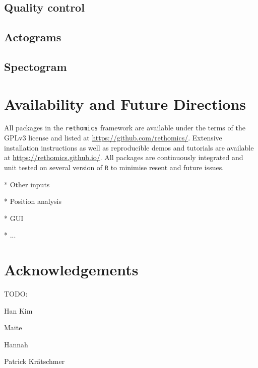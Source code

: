 \documentclass[10pt,letterpaper]{article}
\begin{document}
\subsection*{Quality control}

\subsection*{Actograms}


\subsection*{Spectogram}


\section*{Availability and Future Directions}
All packages in the \texttt{rethomics} framework are available under the terms of the GPLv3 license and listed at  		\href{https://github.com/rethomics}{https://github.com/rethomics/}.
Extensive installation instructions as well as reproducible demos and tutorials are available at
\href{https://rethomics.github.io/}{https://rethomics.github.io/}.
All packages are continuously integrated and unit tested on several version of \texttt{R} to minimise resent and future issues.

* Other inputs 

* Position analysis

* GUI

* ... 


\section*{Acknowledgements}
TODO:

Han Kim

Maite

Hannah 

Patrick Kr{\"a}tschmer



\nolinenumbers

%
%
% 
\end{document}
